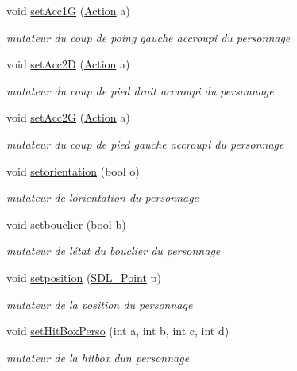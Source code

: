 \begin{DoxyCompactItemize}
void \hyperlink{class_personnage_aa44ab7df73f244df3ac675661630e7de}{set\+Acc1G} (\hyperlink{class_action}{Action} a)
\begin{DoxyCompactList}\small\item\em mutateur du coup de poing gauche accroupi du personnage \end{DoxyCompactList}\item 
void \hyperlink{class_personnage_abadec9cf87f25796e9467b0c58750a60}{set\+Acc2D} (\hyperlink{class_action}{Action} a)
\begin{DoxyCompactList}\small\item\em mutateur du coup de pied droit accroupi du personnage \end{DoxyCompactList}\item 
void \hyperlink{class_personnage_a879d794e4f9f8909b72223e71a11a677}{set\+Acc2G} (\hyperlink{class_action}{Action} a)
\begin{DoxyCompactList}\small\item\em mutateur du coup de pied gauche accroupi du personnage \end{DoxyCompactList}\item 
void \hyperlink{class_personnage_a5ebd03957e03f7b81160f767bd51ccf4}{setorientation} (bool o)
\begin{DoxyCompactList}\small\item\em mutateur de l\textquotesingle{}orientation du personnage \end{DoxyCompactList}\item 
void \hyperlink{class_personnage_a15950ba47d8b699b3768e13aaace6631}{setbouclier} (bool b)
\begin{DoxyCompactList}\small\item\em mutateur de l\textquotesingle{}état du bouclier du personnage \end{DoxyCompactList}\item 
void \hyperlink{class_personnage_a4c28737b88837b44388bd144c198ac6e}{setposition} (\hyperlink{struct_s_d_l___point}{S\+D\+L\+\_\+\+Point} p)
\begin{DoxyCompactList}\small\item\em mutateur de la position du personnage \end{DoxyCompactList}\item 
void \hyperlink{class_personnage_a7fa6e4b3dcb7760cd4533b57d9df7f77}{set\+Hit\+Box\+Perso} (int a, int b, int c, int d)
\begin{DoxyCompactList}\small\item\em mutateur de la hitbox d\textquotesingle{}un personnage \end{DoxyCompactList}\item 

\end{DoxyCompactItemize}
